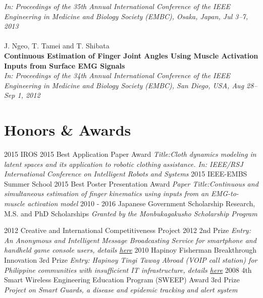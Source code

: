 \documentclass[]{friggeri-cv}
\begin{document}
\small{\emph{In: Proceedings of the 35th Annual International Conference of the IEEE Engineering in Medicine and Biology Society (EMBC), Osaka, Japan, Jul 3–7, 2013}}
\\
\\
J. Ngeo, T. Tamei and T. Shibata\\
\textbf{Continuous Estimation of Finger Joint Angles Using Muscle Activation Inputs from Surface EMG Signals}\\
\small{\emph{In: Proceedings of the 34th Annual International Conference of the IEEE Engineering in Medicine and Biology Society (EMBC), San Diego, USA, Aug 28–Sep 1, 2012}}

\section{Honors \& Awards}
\begin{entrylist}
  \entry
    {2015}
    {IROS 2015} 
    {Best Application Paper Award}
    {\emph{Title:Cloth dynamics modeling in latent spaces and its application to robotic clothing assistance. In: IEEE/RSJ International Conference on Intelligent Robots and Systems}}
  \entry
    {2015}
    {IEEE-EMBS Summer School 2015} 
    {Best Poster Presentation Award}
    {\emph{Paper Title:Continuous and simultaneous estimation of finger kinematics using inputs from an EMG-to-muscle activation model}}
  \entry
    {2010 - 2016}
    {Japanese Government Scholarship}
    {Research, M.S. and PhD Scholarships}
    {\emph{Granted by the Monbukagakusho Scholarship Program}}
    
  \entry
    {2012}
    {Creative and International Competitiveness Project 2012}
    {2nd Prize}
    {\emph{Entry: An Anonymous and Intelligent Message Broadcasting Service for smartphone and handheld game console users, details \href{https://cicp.naist.jp/ja/}{here}}}
  \entry
    {2010}
    {Hapinoy Fisherman Breakthrough Innovation}
    {3rd Prize}
    {\emph{Entry: Hapinoy Tingi Tawag Abroad (VOIP call station) for Philippine communities with insufficient IT infrastructure, details \href{https://www.fishermanfoundation.com/hapinoy.html}{here}}}
   \entry
    {2008}
    {4th Smart Wireless Engineering Education Program (SWEEP) Award}
    {3rd Prize}
    {\emph{Project on Smart Guards, a disease and epidemic tracking and alert system}}
\end{entrylist}
\end{document}
